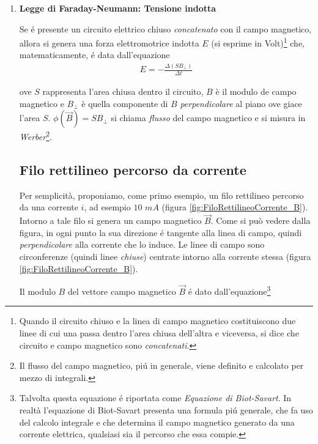 \documentclass[17pt]{extarticle}
\begin{document}
\begin{enumerate}
	\item {\bf Legge di Faraday-Neumann: Tensione indotta}
	
	
	
	Se \'e presente un circuito elettrico chiuso \emph{concatenato} con il campo magnetico, allora si genera una forza elettromotrice indotta $E$ (si esprime in Volt)\footnote{Quando il circuito chiuso e la linea di campo magnetico costituiscono due linee di cui una passa dentro l'area chiusa dell'altra e viceversa, si dice che circuito e campo magnetico sono \emph{concatenati}.} che, matematicamente, \'e data dall'equazione
\begin{eqnarray}\label{eq:FaradayNeunman}
	E = -\frac{\Delta (SB_{\perp})}{\Delta t}
\end{eqnarray}	
	
	ove $S$ rappresenta l'area chiusa dentro il circuito, $B$ è il modulo de campo magnetico e $B_{\perp}$ è quella componente di $B$ \emph{perpendicolare} al piano ove giace l'area $S$. $\phi(\vec{B}) = SB_{\perp}$ si chiama \emph{flusso} del campo magnetico  e si misura in \emph{Werber}\footnote{Il flusso del campo magnetico, pi\'u in generale, viene definito e calcolato per mezzo di integrali.}. %





\subsection{Filo rettilineo percorso da corrente}

Per semplicità, proponiamo, come primo esempio, un filo rettilineo percorso da una corrente $i$, ad esempio $10$ $mA$ (figura \ref{fig:FiloRettilineoCorrente_B}). 
Intorno a tale filo si genera un campo magnetico $\vec{B}$. Come si può vedere dalla figura, in ogni punto la sua direzione \'e tangente alla linea di campo, quindi \emph{perpendicolare} alla corrente che lo induce. Le linee di campo sono circonferenze (quindi linee \emph{chiuse}) centrate intorno alla corrente stessa (figura \ref{fig:FiloRettilineoCorrente_B}).




Il modulo $B$ del vettore campo magnetico $\vec{B}$ \'e dato dall'equazione\footnote{Talvolta questa equazione \'e riportata come \emph{Equazione di Biot-Savart}. In realtà l'equazione di Biot-Savart presenta una formula pi\'u generale, che fa uso del calcolo integrale e che determina il campo magnetico generato da una corrente elettrica, qualsiasi sia il percorso che essa compie. }


\end{enumerate}
\end{document}
